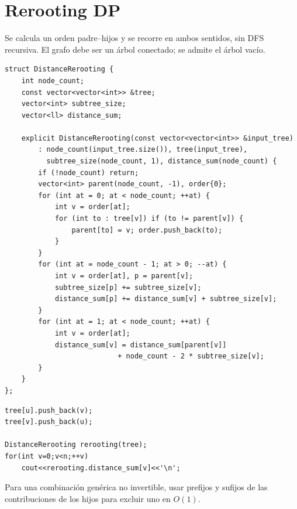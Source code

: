 \section{Rerooting DP}

Se calcula un orden padre--hijos y se recorre en ambos sentidos, sin DFS
recursiva. El grafo debe ser un árbol conectado; se admite el árbol vacío.

\begin{lstlisting}[style=cpp]
struct DistanceRerooting {
    int node_count;
    const vector<vector<int>> &tree;
    vector<int> subtree_size;
    vector<ll> distance_sum;

    explicit DistanceRerooting(const vector<vector<int>> &input_tree)
        : node_count(input_tree.size()), tree(input_tree),
          subtree_size(node_count, 1), distance_sum(node_count) {
        if (!node_count) return;
        vector<int> parent(node_count, -1), order{0};
        for (int at = 0; at < node_count; ++at) {
            int v = order[at];
            for (int to : tree[v]) if (to != parent[v]) {
                parent[to] = v; order.push_back(to);
            }
        }
        for (int at = node_count - 1; at > 0; --at) {
            int v = order[at], p = parent[v];
            subtree_size[p] += subtree_size[v];
            distance_sum[p] += distance_sum[v] + subtree_size[v];
        }
        for (int at = 1; at < node_count; ++at) {
            int v = order[at];
            distance_sum[v] = distance_sum[parent[v]]
                           + node_count - 2 * subtree_size[v];
        }
    }
};
\end{lstlisting}
\begin{lstlisting}[style=cpp]
tree[u].push_back(v);
tree[v].push_back(u);

DistanceRerooting rerooting(tree);
for(int v=0;v<n;++v)
    cout<<rerooting.distance_sum[v]<<'\n';
\end{lstlisting}
Para una combinaci\'on gen\'erica no invertible, usar prefijos y sufijos de las
contribuciones de los hijos para excluir uno en $O(1)$.
